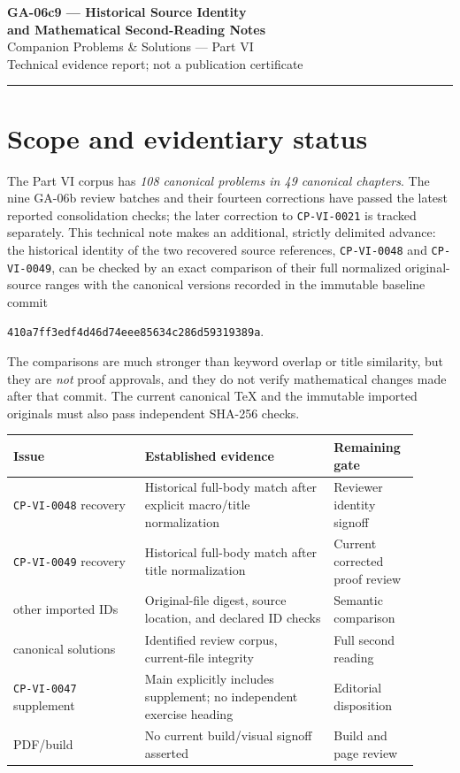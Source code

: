 \documentclass[11pt,a4paper]{article}
\newcommand{\CP}[1]{\texttt{CP-VI-#1}}
\begin{document}
\begin{center}
{\Large\bfseries\color{heading} GA-06c9 --- Historical Source Identity\\ and Mathematical Second-Reading Notes}\\[6pt]
{\normalsize Companion Problems \& Solutions --- Part VI}\\[4pt]
{\small Technical evidence report; not a publication certificate}
\end{center}
\vspace{3pt}\hrule\vspace{8pt}

\section{Scope and evidentiary status}
The Part VI corpus has \emph{108 canonical problems in 49 canonical chapters}. The nine GA-06b review batches and their fourteen corrections have passed the latest reported consolidation checks; the later correction to \CP{0021} is tracked separately. This technical note makes an additional, strictly delimited advance: the historical identity of the two recovered source references, \CP{0048} and \CP{0049}, can be checked by an exact comparison of their full normalized original-source ranges with the canonical versions recorded in the immutable baseline commit
\begin{center}\texttt{410a7ff3edf4d46d74eee85634c286d59319389a}.\end{center}
The comparisons are much stronger than keyword overlap or title similarity, but they are \emph{not} proof approvals, and they do not verify mathematical changes made after that commit. The current canonical TeX and the immutable imported originals must also pass independent SHA-256 checks.

\begin{center}\begin{tabular}{>{\raggedright\arraybackslash}p{0.30\linewidth}>{\raggedright\arraybackslash}p{0.43\linewidth}>{\raggedright\arraybackslash}p{0.18\linewidth}}
\toprule\textbf{Issue}&\textbf{Established evidence}&\textbf{Remaining gate}\\\midrule
\CP{0048} recovery&Historical full-body match after explicit macro/title normalization&Reviewer identity signoff\\
\CP{0049} recovery&Historical full-body match after title normalization&Current corrected proof review\\
47 other imported IDs&Original-file digest, source location, and declared ID checks&Semantic comparison\\
25 canonical solutions&Identified review corpus, current-file integrity&Full second reading\\
\CP{0047} supplement&Main explicitly includes supplement; no independent exercise heading&Editorial disposition\\
PDF/build&No current build/visual signoff asserted&Build and page review\\\bottomrule
\end{tabular}\end{center}
\end{document}

